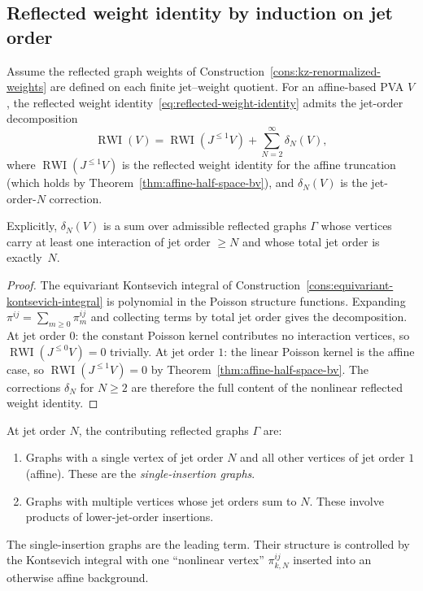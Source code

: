 \subsection{Reflected weight identity by induction on jet order}

\begin{theorem}
\label{thm:jet-inductive-rwi}
Assume the reflected graph weights of Construction~\ref{cons:kz-renormalized-weights} are defined on each
finite jet--weight quotient. For an affine-based PVA $V$, the reflected
weight identity~\eqref{eq:reflected-weight-identity} admits the jet-order decomposition
\begin{equation}\label{eq:jet-rwi-decomposition}
\operatorname{RWI}(V)
=
\operatorname{RWI}(J^{\le 1}V)
+
\sum_{N=2}^{\infty}\delta_N(V),
\end{equation}
where $\operatorname{RWI}(J^{\le 1}V)$ is the reflected weight identity
for the affine truncation (which holds by
Theorem~\ref{thm:affine-half-space-bv}), and $\delta_N(V)$ is the
jet-order-$N$ correction.

Explicitly, $\delta_N(V)$ is a sum over admissible reflected graphs
$\Gamma$ whose vertices carry at least one interaction of jet order
$\ge N$ and whose total jet order is exactly~$N$.
\end{theorem}

\begin{proof}
The equivariant Kontsevich integral of
Construction~\ref{cons:equivariant-kontsevich-integral} is polynomial in
the Poisson structure functions. Expanding
$\pi^{ij}=\sum_{m\ge 0}\pi^{ij}_m$ and collecting terms by total
jet order gives the decomposition. At jet order $0$: the constant
Poisson kernel contributes no interaction vertices, so
$\operatorname{RWI}(J^{\le 0}V)=0$ trivially. At jet order $1$: the
linear Poisson kernel is the affine case, so
$\operatorname{RWI}(J^{\le 1}V)=0$ by
Theorem~\ref{thm:affine-half-space-bv}. The corrections $\delta_N$
for $N\ge 2$ are therefore the full content of the nonlinear reflected
weight identity.
\end{proof}

\begin{construction}
\label{cons:jet-N-graphs}
At jet order $N$, the contributing reflected graphs $\Gamma$ are:
\begin{enumerate}
\item Graphs with a single vertex of jet order $N$ and all other
 vertices of jet order $1$ (affine). These are the
 \emph{single-insertion graphs}.
\item Graphs with multiple vertices whose jet orders sum to $N$.
 These involve products of lower-jet-order insertions.
\end{enumerate}
The single-insertion graphs are the leading term. Their structure
is controlled by the Kontsevich integral with one ``nonlinear vertex''
$\pi^{ij}_{k,N}$ inserted into an otherwise affine background.
\end{construction}

